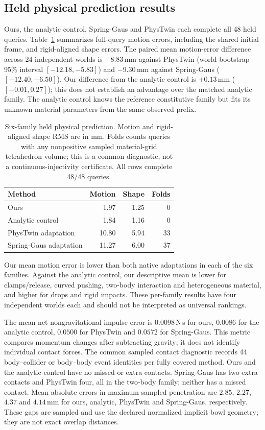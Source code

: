 \subsection{Held physical prediction results}
\label{sec:coupled-physical-results}
Ours, the analytic control, Spring-Gaus and PhysTwin each complete all
48 held queries. Table~\ref{tab:coupled-physical} summarizes full-query
motion errors, including the shared initial frame, and rigid-aligned shape
errors. The paired mean motion-error difference across 24 independent
worlds is $-8.83$\,mm against PhysTwin (world-bootstrap 95\% interval
$[-12.18,-5.83]$) and $-9.30$\,mm against Spring-Gaus
($[-12.40,-6.50]$). Our difference from the analytic control is
$+0.13$\,mm ($[-0.01,0.27]$); this does not establish an advantage over
the matched analytic family. The analytic control knows the reference
constitutive family but fits its unknown material parameters from the same
observed prefix.

\begin{table}[t]
\centering\small
\caption{Six-family held physical prediction. Motion and rigid-aligned
shape RMS are in mm. Folds counts queries with any nonpositive sampled
material-grid tetrahedron volume; this is a common diagnostic, not a
continuous-injectivity certificate. All rows complete 48/48 queries.}
\label{tab:coupled-physical}
\begin{tabular}{lrrr}
\toprule Method & Motion & Shape & Folds \\
\midrule
Ours & 1.97 & 1.25 & 0 \\
Analytic control & 1.84 & 1.16 & 0 \\
PhysTwin adaptation & 10.80 & 5.94 & 33 \\
Spring-Gaus adaptation & 11.27 & 6.00 & 37 \\
\bottomrule
\end{tabular}
\end{table}

Our mean motion error is lower than both native adaptations in each of
the six families. Against the analytic control, our descriptive mean is
lower for clamps/release, curved pushing, two-body interaction and
heterogeneous material, and higher for drops and rigid impacts.
These per-family results have four independent worlds each and should not
be interpreted as universal rankings.

The mean net nongravitational impulse error is $0.0098$\,N\,s for ours,
$0.0086$ for the analytic control, $0.0500$ for PhysTwin and $0.0572$
for Spring-Gaus. This metric compares momentum changes after subtracting
gravity; it does not identify individual contact forces.
The common sampled contact diagnostic records 44 body--collider or
body--body event identities per fully covered method. Ours and the
analytic control have no missed or extra contacts. Spring-Gaus has two
extra contacts and PhysTwin four, all in the two-body family; neither
has a missed contact. Mean absolute errors in maximum sampled penetration
are $2.85$, $2.27$, $4.37$ and $4.14$\,mm for ours, analytic, PhysTwin
and Spring-Gaus, respectively. These gaps are sampled and use the declared
normalized implicit bowl geometry; they are not exact overlap distances.

